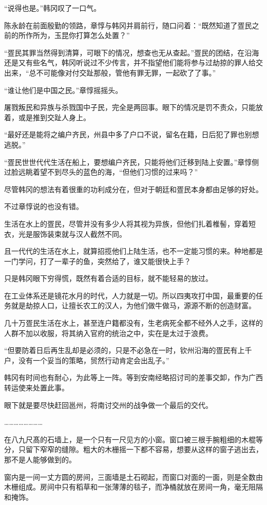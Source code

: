 “说得也是。”韩冈叹了一口气。

陈永龄在前面殷勤的领路，章惇与韩冈并肩前行，随口问着：“既然知道了疍民之前的所作所为，玉昆你打算怎么处置？”

“疍民其罪当然得到清算，可眼下的情况，想查也无从查起。”疍民的团结，在沿海还是又有些名气，韩冈听说过不少传言，并不指望他们能将参与过劫掠的罪人给交出来，“总不可能像对付交趾那般，管他有罪无罪，一起砍了了事。”

“谁让他们是中国之民。”章惇摇摇头。

屠戮叛民和异族与杀戮国中子民，完全是两回事。眼下的情况是罚不责众，只能放着，或是推到交趾人身上。

“最好还是能将之编户齐民，州县中多了户口不说，留名在籍，日后犯了罪也别想逃脱。”

“疍民世世代代生活在船上，要想编户齐民，只能将他们迁移到陆上安置。”章惇侧过脸远眺着望不到尽头的蓝色的海，“但他们习惯的过来吗？”

尽管韩冈的想法有着很重的功利成分在，但对于朝廷和疍民本身都由足够的好处。

不过章惇说的也没有错。

生活在水上的疍民，尽管并没有多少人将其视为异族，但他们扎着椎髻，穿着短衣，光是服饰装束就与汉人截然不同。

且一代代的生活在水上，就算招揽他们上陆生活，也不一定能习惯的来。种地都是一门学问，打了一辈子的鱼，突然给了，谁又能很快上手？

只是韩冈眼下穷得慌，既然有着合适的目标，就不能轻易的放过。

在工业体系还是镜花水月的时代，人力就是一切。所以四夷攻打中国，最重要的任务就是劫掠人口，让擅长农工的汉人，为他们做牛做马，源源不断的创造财富。

几十万疍民生活在水上，甚至连户籍都没有，生老病死全都不经外人之手，这样的人群不加以收服，将其纳入官府的统治之中，实在是太过于浪费。

“但要防着日后再生乱却是必须的，只是不必急在一时，钦州沿海的疍民有上千户，没有一个妥当的策略，贸然行动肯定会出乱子。”

韩冈有时间也有耐心，为此等上一阵。等到安南经略招讨司的差事交卸，作为广西转运使来处置此事。

眼下就是要尽快赶回邕州，将南讨交州的战争做一个最后的交代。

……………………

在八九尺髙的石墙上，是一个只有一尺见方的小窗。窗口被三根手腕粗细的木棍等分，只留下窄窄的缝隙。粗大的木栅摇一下都不容易，想要从这样的窗子逃出去，那不是人能够做到的。

窗内是一间一丈方圆的房间，三面墙是土石砌起，而窗口对面的一面，则是全数由木栅组成。房间中只有稻草和一张薄薄的毯子，而净桶就放在房间一角，毫无阻隔和掩饰。

